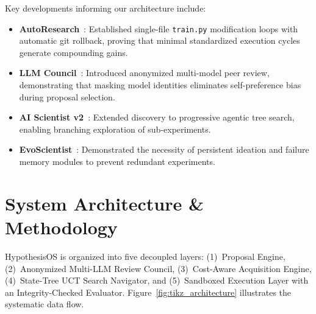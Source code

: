 \documentclass[10pt,twocolumn,3p,times]{article}
\begin{document}
Key developments informing our architecture include:
\begin{itemize}
    \item \textbf{AutoResearch}~\cite{karpathy2026autoresearch}: Established single-file \texttt{train.py} modification loops with automatic git rollback, proving that minimal standardized execution cycles generate compounding gains.
    \item \textbf{LLM Council}~\cite{karpathy2025llmcouncil}: Introduced anonymized multi-model peer review, demonstrating that masking model identities eliminates self-preference bias during proposal selection.
    \item \textbf{AI Scientist v2}~\cite{lu2025aiscientistv2}: Extended discovery to progressive agentic tree search, enabling branching exploration of sub-experiments.
    \item \textbf{EvoScientist}~\cite{lu2026evoscientist}: Demonstrated the necessity of persistent ideation and failure memory modules to prevent redundant experiments.
\end{itemize}

\section{System Architecture \& Methodology}
\label{sec:architecture}

HypothesisOS is organized into five decoupled layers: (1)~Proposal Engine, (2)~Anonymized Multi-LLM Review Council, (3)~Cost-Aware Acquisition Engine, (4)~State-Tree UCT Search Navigator, and (5)~Sandboxed Execution Layer with an Integrity-Checked Evaluator. Figure~\ref{fig:tikz_architecture} illustrates the systematic data flow.
\end{document}
